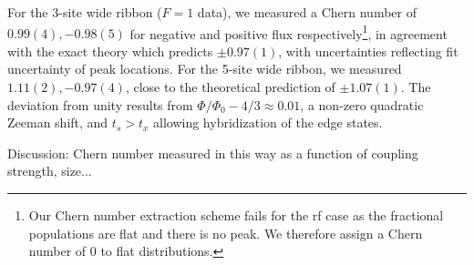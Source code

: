  For the 3-site wide ribbon ($F=1$ data), we measured a Chern number of $0.99(4), -0.98(5)$ for negative and positive flux respectively\footnote{Our Chern number extraction scheme fails for the rf case as the fractional populations are flat and there is no peak. We therefore assign a Chern number of $0$ to flat distributions.}, in agreement with the exact theory which predicts $\pm0.97(1)$, with uncertainties reflecting fit uncertainty of peak locations.  For the 5-site wide ribbon,  we measured $1.11(2), -0.97(4)$, close to the theoretical prediction of $\pm 1.07(1)$. The deviation from unity results from $\Phi/\Phi_0-4/3\approx0.01$, a non-zero quadratic Zeeman shift, and $t_s>t_x$ allowing hybridization of the edge states\cite{Mugel2017}.

Discussion: Chern number measured in this way as a function of coupling strength, size...
%
